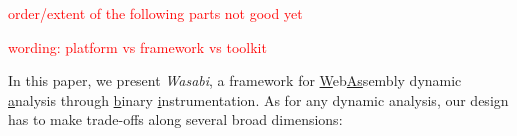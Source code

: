 \documentclass[sigplan,review,anonymous]{acmart}\settopmatter{printfolios=true,printccs=false,printacmref=false}
\newcommand{\todo}[1]{\textcolor{red}{#1}}
\begin{document}

\noindent \todo{order/extent of the following parts not good yet}

\noindent \todo{wording: platform vs framework vs toolkit}

In this paper, we present \emph{Wasabi}, a framework for \underline{W}eb\-\underline{As}sembly dynamic \underline{a}nalysis through \underline{b}inary \underline{i}nstrumentation. As for any dynamic analysis, our design has to make trade-offs along several broad dimensions:
\end{document}
